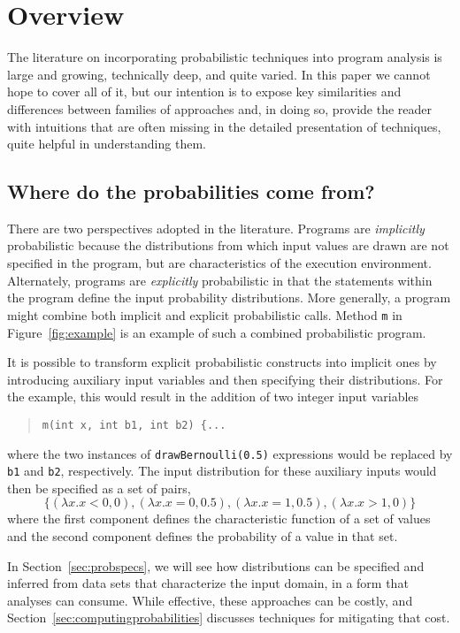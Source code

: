 \section{Overview}
\label{sec:overview}

The literature on incorporating probabilistic techniques into 
program analysis is large and growing, technically deep, and quite
varied.  In this paper we cannot hope to cover all of it, but our
intention is to expose key similarities and differences between 
families of approaches and, in doing so, provide the reader with
intuitions that are often missing in the detailed presentation of
techniques, quite helpful in understanding them.

\subsection{Where do the probabilities come from?}
There are two perspectives adopted in the literature.
Programs are \textit{implicitly} probabilistic because the distributions
from which input values are drawn are not specified in the program,
but are characteristics of the execution environment.
Alternately, programs are \textit{explicitly} probabilistic in 
that the statements
within the program define the input probability distributions.
More generally, a program might combine both implicit and explicit
probabilistic calls.  Method \texttt{m} in Figure~\ref{fig:example}
is an example of such a combined probabilistic program.

It is possible to transform explicit probabilistic constructs
into implicit ones
by introducing auxiliary input variables and then specifying
their distributions.   For the example, this would result
in the addition of two integer input variables 
\begin{quote}
\texttt{m(int x, int b1, int b2) \{...} 
\end{quote}
where the two instances of
\texttt{drawBernoulli(0.5)} expressions would be replaced
by \texttt{b1} and \texttt{b2}, respectively.  The input
distribution for these auxiliary inputs would then be specified
as a set of pairs,
\[
\{ (\lambda x.x<0,0), (\lambda x.x=0,0.5), (\lambda x.x=1,0.5), (\lambda x.x>1,0) \}
\]
where the first component defines the characteristic function
of a set of values and the second component defines the probability
of a value in that set.

In Section~\ref{sec:probspecs}, we will see how distributions can
be specified and inferred from data sets that characterize the
input domain, in a form that 
analyses can consume.  While effective, these approaches can be
costly, and Section~\ref{sec:computingprobabilities} discusses
techniques for mitigating that cost.

